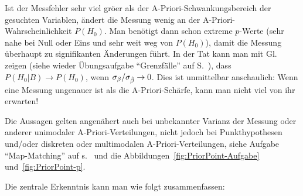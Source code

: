 \item Ist der Messfehler sehr viel gr\"o\3er als der A-Priori-Schwankungsbereich
  der gesuch\-ten Variablen, \"andert die Messung wenig an der
  A-Priori-Wahr\-schein\-lich\-keit $P(H_0)$. Man ben\"otigt dann schon extreme
  $p$-Werte (sehr nahe bei Null oder Eins und sehr weit weg von
  $P(H_0)$), damit die Messung \"uberhaupt zu signifikanten
  \"Anderungen f\"uhrt. In der Tat kann man
  mit Gl.~ zeigen (siehe wieder
  \"Ubungsaufgabe ``Grenzf\"alle'' auf S.~\pageref{aufg:Grenzfaelle}), dass $P(H_0| B) 
  \to P(H_0)$, wenn $\sigma_{\beta}/\sigma_{\hat{\beta}} \to 0$. Dies ist unmittelbar
  anschaulich: Wenn eine Messung ungenauer ist als die
  A-Priori-Sch\"arfe, kann man nicht viel von ihr erwarten!

\item 
 Die Aussagen gelten angen\"ahert auch bei unbekannter
  Varianz der Messung oder anderer unimodaler A-Priori-Verteilungen,
  nicht jedoch bei Punkt\-hypothesen und/\-oder diskreten oder
  multimodalen A-Priori-Verteilungen, siehe Aufgabe ``Map-Matching''
  auf s.~\pageref{aufg:MapMatching} und die
  Abbildungen~\ref{fig:PriorPoint-Aufgabe} und~\ref{fig:PriorPoint-p}.
\ei

Die zentrale Erkenntnis kann man wie folgt zusammenfassen:


